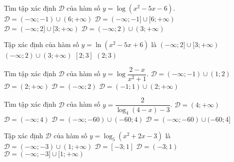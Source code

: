 \begin{ex}
	Tìm tập xác định $\mathscr{D}$ của hàm số $y=\log\left(x^2-5x-6\right)$.
	\choice
	{\True $\mathscr{D}=(-\infty;-1)\cup(6;+\infty)$}
	{$\mathscr{D}=(-\infty;-1]\cup[6;+\infty)$}
	{$\mathscr{D}=(-\infty;2]\cup[3;+\infty)$}
	{$\mathscr{D}=(-\infty;2)\cup(3;+\infty)$}
\end{ex}

\begin{ex}
	Tập xác định của hàm số $y=\ln \left(x^2-5x+6\right)$ là
	\choice
	{$(-\infty;2]\cup[3;+\infty)$}
	{\True $(-\infty;2)\cup(3;+\infty)$}
	{$[2;3]$}
	{$(2;3)$}
\end{ex}

\begin{ex}
	Tìm tập xác định $\mathscr{D}$ của hàm số $y=\log\dfrac{2-x}{x^2+1}$.
	\choice
	{$\mathscr{D}=(-\infty;-1)\cup(1;2)$}
	{$\mathscr{D}=(2;+\infty)$}
	{\True $\mathscr{D}=(-\infty;2)$}
	{$\mathscr{D}=(-1;1)\cup(2;+\infty)$}
\end{ex}

\begin{ex}
	Tìm tập xác định $\mathscr D$ của hàm số $y = \dfrac{2}{\log_4 (4 - x) - 3}$.
	\choice
	{$  \mathscr D = (4; +\infty) $}
	{$ \mathscr D = (-\infty; 4)  $}
	{\True $ \mathscr D = (-\infty; -60) \cup (-60; 4) $}
	{$ \mathscr D = (-\infty; -60) \cup (-60; 4] $}
\end{ex}

\begin{ex}
	Tập xác định $\mathscr{D}$ của hàm số $y=\log_5(x^2+2x-3)$ là
	\choice
	{\True $\mathscr{D}=(-\infty;-3)\cup(1;+\infty)$}
	{$\mathscr{D}=[-3;1]$}
	{$\mathscr{D}=(-3;1)$}
	{$\mathscr{D}=(-\infty;-3]\cup[1;+\infty)$}
\end{ex}



